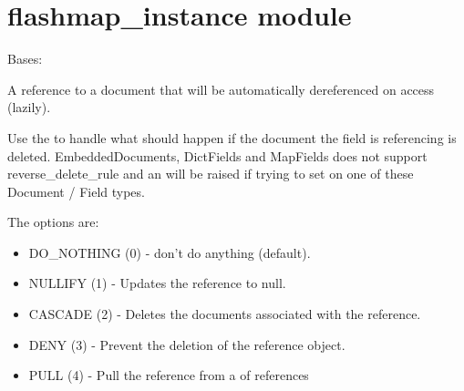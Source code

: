 \documentclass[letterpaper,10pt,english]{sphinxmanual}
\begin{document}
\chapter{flashmap\_instance module}
\label{\detokenize{flashmap_instance:flashmap-instance-module}}\label{\detokenize{flashmap_instance:module-flashmap_instance}}\label{\detokenize{flashmap_instance::doc}}

\begin{fulllineitems}
\label{\detokenize{flashmap_instance:flashmap_instance.FlashmapInstance}}
Bases: {\hyperref[\detokenize{flash_instance:flash_instance.FlashInstance}]{}}

\begin{fulllineitems}
\label{\detokenize{flashmap_instance:flashmap_instance.FlashmapInstance.reference}}
A reference to a document that will be automatically dereferenced on
access (lazily).

Use the  to handle what should happen if the document
the field is referencing is deleted.  EmbeddedDocuments, DictFields and
MapFields does not support reverse\_delete\_rule and an 
will be raised if trying to set on one of these Document / Field types.

The options are:
\begin{itemize}
\item {} 
DO\_NOTHING (0)  - don't do anything (default).

\item {} 
NULLIFY    (1)  - Updates the reference to null.

\item {} 
CASCADE    (2)  - Deletes the documents associated with the reference.

\item {} 
DENY       (3)  - Prevent the deletion of the reference object.

\item {} 
PULL       (4)  - Pull the reference from a  of references

\end{itemize}


\end{fulllineitems}
\end{fulllineitems}
\end{document}
